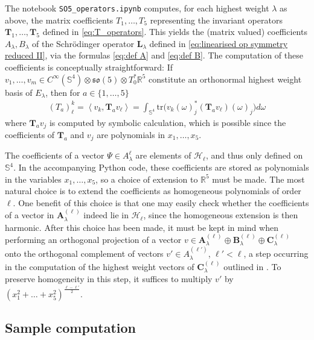 \documentclass[11pt,reqno]{amsart}
\theoremstyle{remark}
\theoremstyle{definition}
\newcommand{\tr}{\mathrm{tr}}
\newcommand{\sov}{\mathfrak{so}(5)}
\begin{document}
The notebook \texttt{SO5\_operators.ipynb} computes, for each highest weight $\lambda$ as above, the matrix coefficients $T_1,\ldots,T_5$ representing the invariant operators $\mathbf T_1,\ldots,\mathbf T_5$ defined in \eqref{eq:T_operators}. This yields the (matrix valued) coefficients $A_\lambda, B_\lambda$ of the Schr\"odinger operator $\mathbf L_{\lambda}$ defined in \eqref{eq:linearised op symmetry reduced II}, via the formulas \eqref{eq:def A} and \eqref{eq:def B}. The computation of these coefficients is conceptually straightforward: If $v_1,\ldots,v_m \in C^\infty(\mathbb S^4) \otimes \sov \otimes T_0^\ast \mathbb R^5$ constitute an orthonormal highest weight basis of $E_\lambda$, then for $a \in \{1,\ldots,5\}$
\begin{align*}
    (T_a)^k_\ell = \left\langle v_k, \mathbf T_a v_\ell \right\rangle = \int_{\mathbb S^4} \tr\big( v_k(\omega)_j^\ast (\mathbf T_a v_\ell)(\omega)_j \big) d\omega
\end{align*}
where $\mathbf T_a v_j$ is computed by symbolic calculation, which is possible since the coefficients of $\mathbf T_a$ and $v_j$ are polynomials in $x_1,\ldots,x_5$.

The coefficients of a vector $\Psi \in A^{\ell}_\lambda$ are elements of $\mathcal H_\ell$, and thus only defined on $\mathbb S^4$. In the accompanying Python code, these coefficients are stored as polynomials in the variables $x_1,\ldots,x_5$, so a choice of extension to $\mathbb R^5$ must be made. The most natural choice is to extend the coefficients as homogeneous polynomials of order $\ell$. One benefit of this choice is that one may easily check whether the coefficients of a vector in $\mathbf A^{(\ell)}_\lambda$ indeed lie in $\mathcal H_\ell$, since the homogeneous extension is then harmonic. After this choice has been made, it must be kept in mind when performing an orthogonal projection of a vector $v \in \mathbf A^{(\ell)}_\lambda \oplus \mathbf B^{(\ell)}_\lambda \oplus \mathbf C^{(\ell)}_\lambda$ onto the orthogonal complement of vectors $v' \in A^{(\ell')}_\lambda$, $\ell' < \ell$, a step occurring in the computation of the highest weight vectors of $\mathbf C^{(\ell)}_\lambda$ outlined in . To preserve homogeneity in this step, it suffices to multiply $v'$ by $(x_1^2 + \ldots + x_5^2)^{\frac{\ell-\ell'}{2}}$.

\subsection{Sample computation}
\end{document}
